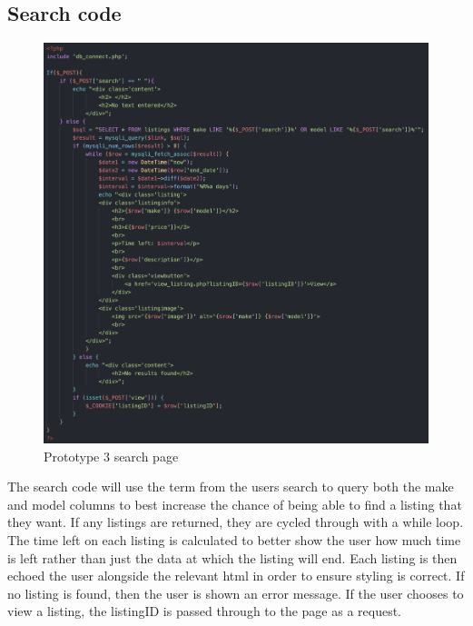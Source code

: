 \subsection{Search code}
 \begin{figure}[H]
    \centering
    \includegraphics[scale=0.5]{ch3_developing/proto3/search.png}
    \caption{Prototype 3 search page}
    \label{fig:proto3_search}
\end{figure}
The search code will use the term from the users search to query both the make and model columns to best increase the chance of being able to find a listing that they want. If any listings are returned, they are cycled through with a while loop. The time left on each listing is calculated to better show the user how much time is left rather than just the data at which the listing will end. Each listing is then echoed the user alongside the relevant html in order to ensure styling is correct. If no listing is found, then the user is shown an error message. If the user chooses to view a listing, the listingID is passed through to the page as a request. 
